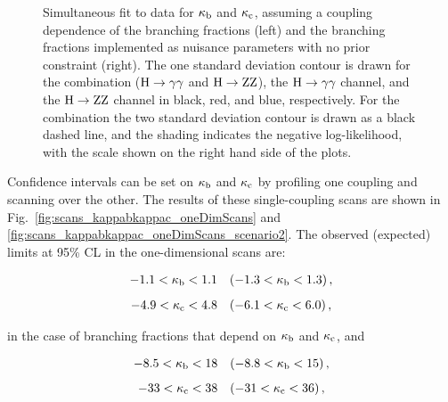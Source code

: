 \begin{figure}[hbtp]
\begin{center}
{        }
    \caption{
        Simultaneous fit to data for $\kappa_{\mathrm{b}}$ and $\kappa_{\mathrm{c}}$, assuming a coupling dependence of the branching fractions (left) and the branching fractions implemented as nuisance parameters with no prior constraint (right).
        The one standard deviation contour is drawn for the combination ($\mathrm{H}\to\mathrm{\gamma}\mathrm{\gamma}$ and $\mathrm{H}\to\mathrm{Z}\mathrm{Z}$), the $\mathrm{H}\to\mathrm{\gamma}\mathrm{\gamma}$ channel, and the $\mathrm{H}\to\mathrm{Z}\mathrm{Z}$ channel in black, red, and blue, respectively.
        For the combination the two standard deviation contour is drawn as a black dashed line, and the shading indicates the negative log-likelihood, with the scale shown on the right hand side of the plots.
        }
    \label{fig:scans_kappabkappac_nominal}
  \end{center}
\end{figure}


Confidence intervals can be set on $\kappa_{\mathrm{b}}$ and $\kappa_{\mathrm{c}}$ by profiling one coupling and scanning over the other.
% 
The results of these single-coupling scans are shown in Fig.~\ref{fig:scans_kappabkappac_oneDimScans} and \ref{fig:scans_kappabkappac_oneDimScans_scenario2}.
% 
The observed (expected) limits at 95\% CL in the one-dimensional scans are:
% 
\begin{linenomath*}
\begin{equation}
\label{eq:kappasensitivity}
\begin{array}{c}
-1.1 < \kappa_{\mathrm{b}} < 1.1  \quad(-1.3 < \kappa_{\mathrm{b}} < 1.3 )  \,,
\\[8pt]
-4.9 < \kappa_{\mathrm{c}} < 4.8 \quad(-6.1 < \kappa_{\mathrm{c}} < 6.0 )
\,,
\end{array}
\end{equation}
\end{linenomath*}
% 
in the case of branching fractions that depend on $\kappa_{\mathrm{b}}$ and $\kappa_{\mathrm{c}}$, and
% 
\begin{linenomath*}
\begin{equation}
\label{eq:kappasensitivity_floatingBRs}
\begin{array}{c}
-8.5 < \kappa_{\mathrm{b}} < 18  \quad(-8.8 < \kappa_{\mathrm{b}} < 15 )  \,,
\\[8pt]
-33 < \kappa_{\mathrm{c}} < 38 \quad(-31 < \kappa_{\mathrm{c}} < 36 )
\,,
\end{array}
\end{equation}
\end{linenomath*}
